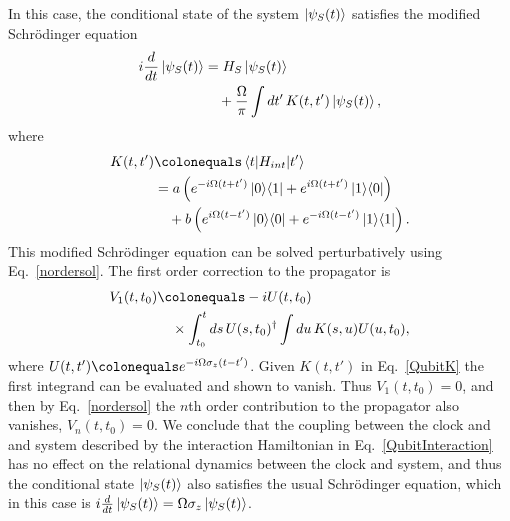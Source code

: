 \documentclass[a4paper,twocolumn,superscriptaddress,11pt,accepted=2019-06-04]{quantumarticle}
\newcommand{\ce}{\colonequals}
\newcommand{\nn}{\nonumber}		%
\begin{document}
{{In this case, the conditional state of the system $\ket{\psi_S(t)}$ satisfies the modified Schr\"{o}dinger equation 
\begin{align}
i \frac{d}{dt} \ket{\psi_S(t)} &= H_S \ket{\psi_S(t)} \nn \\
&\quad + \frac{\Omega}{ \pi}  \int dt'\,  K(t,t') \ket{\psi_S(t)},  \nn
\end{align}
where 
\begin{align}
K(t,t') &\ce \braket{t | H_{int} | t'} \nn \\
&= a \left( e^{-i\Omega (t+t')} \ket{0}\!\bra{1} + e^{i\Omega (t+t')} \ket{1}\!\bra{0} \right)\nn \\
&\quad + b\left( e^{i\Omega (t-t')} \ket{0}\!\bra{0} + e^{-i\Omega (t-t')} \ket{1}\!\bra{1} \right) \label{QubitK}.
\end{align}
This modified Schr\"{o}dinger equation can be solved perturbatively using Eq.~\eqref{nordersol}. The first order correction to the propagator is
\begin{align}
V_1(t,t_0) &\ce  -i   U(t,t_0) \nn \\
&\quad \times \int_{t_0}^{t} ds \, U(s,t_0)^\dagger  \int du \, {K}(s,u) U(u,t_0), \nn
\end{align}
where $U(t,t') \ce e^{-i \Omega \sigma_z (t-t')}$. Given ${K}(t,t')$ in Eq.~\eqref{QubitK} the first integrand can be evaluated and shown to vanish. Thus $V_1(t,t_0) =0$, and then by Eq.~\eqref{nordersol} the $n$th order contribution to the propagator also vanishes, \mbox{$V_n(t,t_0) =0$}. We conclude that the coupling between the clock and and system described by the interaction Hamiltonian in Eq.~\eqref{QubitInteraction} has no effect on the relational dynamics between the clock and system, and thus the conditional state $\ket{\psi_S(t)}$ also satisfies the usual Schr\"{o}dinger equation, which in this case is $ i\tfrac{d}{dt} \ket{\psi_S(t)} = \Omega \sigma_z \ket{\psi_S(t)}$.}

}
\end{document}
